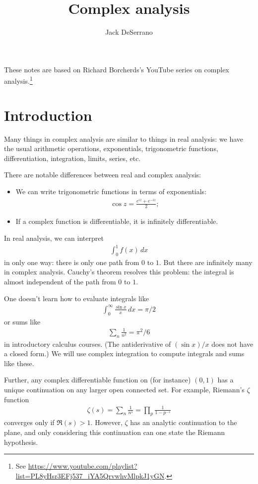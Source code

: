 \documentclass[11pt, oneside,margin=1in]{article}
\title{Complex analysis}
\author{Jack DeSerrano}
\begin{document}
\ifams
    \vspace*{\fill}
\fi
\maketitle
These notes are based on Richard Borcherds's YouTube series on complex analysis.\footnote{See \url{https://www.youtube.com/playlist?list=PL8yHsr3EFj537_iYA5QrvwhvMlpkJ1yGN}.}
\ifams
	\vspace*{\fill}
\fi
\newpage
\section{Introduction}
Many things in complex analysis are similar to things in real analysis: we have the usual arithmetic operations, exponentials, trigonometric functions, differentiation, integration, limits, series, etc.

There are notable differences between real and complex analysis:
\begin{itemize}
	\item We can write trigonometric functions in terms of exponentials:
		\begin{align*}
			\cos z = \frac{e^{iz} + e^{-iz}}{2};
		\end{align*}
	\item If a complex function is differentiable, it is infinitely differentiable.
\end{itemize}

In real analysis, we can interpret
\begin{align*}
	\int_{0}^{1} f(x)   \, dx
\end{align*}
in only one way: there is only one path from $0$ to $1$. But there are infinitely many in complex analysis. Cauchy's theorem resolves this problem: the integral is almost independent of the path from $0$ to $1$.

One doesn't learn how to evaluate integrals like
\begin{align*}
	\int_{0}^{\infty} \frac{\sin x}{x}  \, dx = \pi/2
\end{align*}
or sums like
\begin{align*}
	\sum_n \frac{1}{n^2} = \pi^2/6
\end{align*}
in introductory calculus courses. (The antiderivative of $(\sin x)/x$ does not have a closed form.) We will use complex integration to compute integrals and sums like these.

Further, any complex differentiable function on (for instance) $(0,1)$ has a unique continuation on any larger open connected set. For example, Riemann's $\zeta$ function
 \begin{align*}
	\zeta (s)= \sum_n  \frac{1}{n^s}= \prod_{p} \frac{1}{1-p^{-s}}
\end{align*}
converges only if $\Re(s) > 1$. However, $\zeta$ has an analytic continuation to the plane, and only considering this continuation can one state the Riemann hypothesis. 
\end{document}
